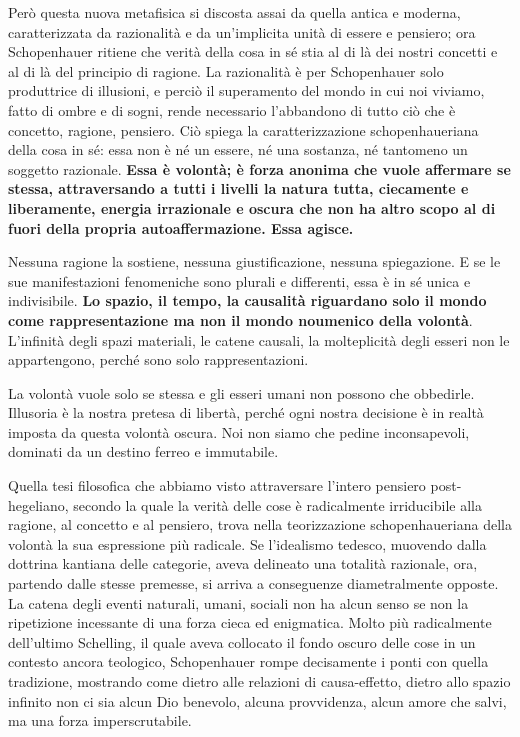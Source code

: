 Però questa nuova metafisica si discosta assai da quella antica e moderna, caratterizzata da razionalità e da un'implicita unità di essere e pensiero; ora Schopenhauer ritiene che verità della cosa in sé stia al di là dei nostri concetti e al di là del principio di ragione. La razionalità è per Schopenhauer solo produttrice di illusioni, e perciò il superamento del mondo in cui noi viviamo, fatto di ombre e di sogni, rende necessario l’abbandono di tutto ciò che è concetto, ragione, pensiero. Ciò spiega la caratterizzazione schopenhaueriana della cosa in sé: essa non è né un essere, né una sostanza, né tantomeno un soggetto razionale. \textbf{Essa è volontà; è forza anonima che vuole affermare se stessa, attraversando a tutti i livelli la natura tutta, ciecamente e liberamente, energia irrazionale e oscura che non ha altro scopo al di fuori della propria autoaffermazione. Essa agisce.}

Nessuna ragione la sostiene, nessuna giustificazione, nessuna spiegazione. E se le sue manifestazioni fenomeniche sono plurali e differenti, essa è in sé unica e indivisibile.\textbf{ Lo spazio, il tempo, la causalità riguardano solo il mondo come rappresentazione ma non il mondo noumenico della volontà}. L’infinità degli spazi materiali, le catene causali, la molteplicità degli esseri non le appartengono, perché sono solo rappresentazioni.

La volontà vuole solo se stessa e gli esseri umani non possono che obbedirle. Illusoria è la nostra pretesa di libertà, perché ogni nostra decisione è in realtà imposta da questa volontà oscura. Noi non siamo che pedine inconsapevoli, dominati da un destino ferreo e immutabile.

Quella tesi filosofica che abbiamo visto attraversare l’intero pensiero post-hegeliano, secondo la quale la verità delle cose è radicalmente irriducibile alla ragione, al concetto e al pensiero, trova nella teorizzazione schopenhaueriana della volontà la sua espressione più radicale. Se l’idealismo tedesco, muovendo dalla dottrina kantiana delle categorie, aveva delineato una totalità razionale, ora, partendo dalle stesse premesse, si arriva a conseguenze diametralmente opposte. La catena degli eventi naturali, umani, sociali non ha alcun senso se non la ripetizione incessante di una forza cieca ed enigmatica.
Molto più radicalmente dell’ultimo Schelling, il quale aveva collocato il fondo oscuro delle cose in un contesto ancora teologico, Schopenhauer rompe decisamente i ponti con quella tradizione, mostrando come dietro alle relazioni di causa-effetto, dietro allo spazio infinito non ci sia alcun Dio benevolo, alcuna provvidenza, alcun amore che salvi, ma una forza imperscrutabile. 

